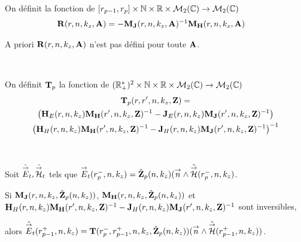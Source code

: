     \begin{defn}
      On définit la fonction de \([r_{p-1}, r_p]\times \mathbb N \times \mathbb R \times \mathcal{M}_{2}(\mathbb C) \rightarrow \mathcal{M}_{2}(\mathbb C)\)
      \begin{align*}
        \mathbf{R}(r,n,k_z,\mathbf{A}) &= -\mathbf{M}_{\mathbf{J}}(r,n,k_z,\mathbf{A})^{-1}\mathbf{M}_{\mathbf{H}}(r,n,k_z,\mathbf{A})
      \end{align*}
    \end{defn}
    A priori \(\mathbf{R}(r,n,k_z,\mathbf{A})\) n'est pas défini pour toute \(\mathbf{A}\).
    \begin{defn}{}~

      On définit \(\mathbf{T}_p\) la fonction de \((\mathbb R_+^*)^2\times\mathbb N\times\mathbb R\times\mathcal{M}_2(\mathbb C)\rightarrow \mathcal{M}_{2}(\mathbb C)\)
      \begin{multline*}
        \mathbf{T}_p(r,r',n,k_z,\mathbf{Z}) = \\
          \left(\mathbf{H}_{E}(r,n,k_z)\mathbf{M}_{\mathbf{H}}(r',n,k_z,\mathbf{Z})^{-1} - \mathbf{J}_{E}(r,n,k_z)\mathbf{M}_{\mathbf{J}}(r',n,k_z,\mathbf{Z})^{-1}\right) 
          \\
          \left(\mathbf{H}_{H}(r,n,k_z)\mathbf{M}_{\mathbf{H}}(r',n,k_z,\mathbf{Z})^{-1} - \mathbf{J}_{H}(r,n,k_z)\mathbf{M}_{\mathbf{J}}(r',n,k_z,\mathbf{Z})^{-1}\right)^{-1}
      \end{multline*}
    \end{defn}

    \begin{prop}~

      Soit \(\hat{{\overset{\rightarrow}{E}}}_t,\hat{{\overset{\rightarrow}{\mathcal{H}}}}_t\) tels que \({\overset{\rightarrow}{E}}_t(r_{p}^-,n,k_z) = \hat{\mathbf{Z}}_{p}(n,k_z)({\overset{\rightarrow}{n}} \wedge \hat{{\overset{\rightarrow}{\mathcal{H}}}}(r_{p}^-,n,k_z)\).

      Si \(\)\(\mathbf{M}_{\mathbf{J}}(r,n,k_z,\hat{\mathbf{Z}}_{p}(n,k_z))\), \(\mathbf{M}_{\mathbf{H}}(r,n,k_z,\hat{\mathbf{Z}}_{p}(n,k_z))\) et \(\mathbf{H}_{H}(r,n,k_z)\mathbf{M}_{\mathbf{H}}(r',n,k_z,\mathbf{Z})^{-1} - \mathbf{J}_{H}(r,n,k_z)\mathbf{M}_{\mathbf{J}}(r',n,k_z,\mathbf{Z})^{-1}\) sont inversibles,

      alors \(\hat{{\overset{\rightarrow}{E}}}_t(r_{p-1}^+,n,k_z) = \mathbf{T}(r_p^-,r_{p-1}^+,n,k_z,\hat{\mathbf{Z}}_{p}(n,k_z))({\overset{\rightarrow}{n}} \wedge \hat{{\overset{\rightarrow}{\mathcal{H}}}}(r_{p-1}^+,n,k_z))\).

    \end{prop}


